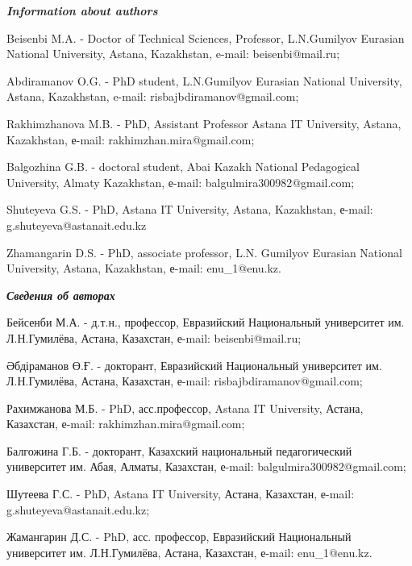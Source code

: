 \begin{info}
\hspace{1em}\emph{{\bfseries Information about authors}}

Beisenbi M.A. - Doctor of Technical Sciences, Professor, L.N.Gumilyov
Eurasian National University, Astana, Kazakhstan, e-mail:
beisenbi@mail.ru;

Abdiramanov O.G. - PhD student, L.N.Gumilyov Eurasian National
University, Astana, Kazakhstan, e-mail:
risbajbdiramanov@gmail.com;

Rakhimzhanova M.B. - PhD, Assistant Professor Astana IT University,
Astana, Kazakhstan, е-mail: rakhimzhan.mira@gmail.com;

Balgozhina G.B. - doctoral student, Abai Kazakh National Pedagogical
University, Almaty Kazakhstan, е-mail: balgulmira300982@gmail.com;

Shuteyeva G.S. - PhD, Astana IT University, Astana, Kazakhstan, е-mail:
g.shuteyeva@astanait.edu.kz

Zhamangarin D.S. - PhD, associate professor, L.N. Gumilyov Eurasian
National University, Astana, Kazakhstan, е-mail:
enu\_1@enu.kz.

\hspace{1em}\emph{{\bfseries Сведения об авторах}}

Бейсенби М.А. - д.т.н., профессор, Евразийский Национальный университет
им. Л.Н.Гумилёва, Астана, Казахстан, е-mail:
beisenbi@mail.ru;

Әбдіраманов Ө.Ғ. - докторант, Евразийский Национальный
университет им. Л.Н.Гумилёва, Астана, Казахстан, е-mail:
risbajbdiramanov@gmail.com;

Рахимжанова М.Б. - PhD, асс.профессор, Astana IT University, Астана,
Казахстан, е-mail: rakhimzhan.mira@gmail.com;

Балгожина Г.Б. - докторант, Казахский национальный педагогический
университет им. Абая, Алматы, Казахстан, е-mail:
balgulmira300982@gmail.com;

Шутеева Г.С. - PhD, Astana IT University, Астана, Казахстан, е-mail:
g.shuteyeva@astanait.edu.kz;

Жамангарин Д.С. - PhD, асс. профессор, Евразийский Национальный
университет им. Л.Н.Гумилёва, Астана, Казахстан, е-mail: enu\_1@enu.kz.
\end{info}
